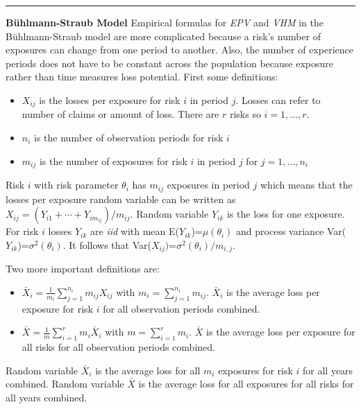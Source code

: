 \documentclass[]{book}
\providecommand{\tightlist}{%
  \setlength{\itemsep}{0pt}\setlength{\parskip}{0pt}}
\theoremstyle{definition}
\theoremstyle{definition}
\theoremstyle{definition}
\theoremstyle{remark}
\begin{document}
\begin{center}\rule{0.5\linewidth}{\linethickness}\end{center}

\textbf{Bühlmann-Straub Model} Empirical formulas for \emph{EPV} and
\emph{VHM} in the Bühlmann-Straub model are more complicated because a
risk's number of exposures can change from one period to another. Also,
the number of experience periods does not have to be constant across the
population because exposure rather than time measures loss potential.
First some definitions:

\begin{itemize}
\tightlist
\item
  \(X_{ij}\) is the losses per exposure for risk \(i\) in period \(j\).
  Losses can refer to number of claims or amount of loss. There are
  \(r\) risks so \(i=1,\ldots,r\).
\item
  \(n_i\) is the number of observation periods for risk \(i\)
\item
  \(m_{ij}\) is the number of exposures for risk \(i\) in period \(j\)
  for \(j=1,\ldots,n_i\)
\end{itemize}

Risk \(i\) with risk parameter \(\theta_i\) has \(m_{ij}\) exposures in
period \(j\) which means that the losses per exposure random variable
can be written as \(X_{ij}=(Y_{i1}+\cdots+Y_{im_{ij}})/m_{ij}\). Random
variable \(Y_{ik}\) is the loss for one exposure. For risk \(i\) losses
\(Y_{ik}\) are \emph{iid} with mean E(\(Y_{ik}\))=\(\mu(\theta_i)\) and
process variance Var(\(Y_{ik}\))=\(\sigma^2(\theta_i)\). It follows that
Var(\(X_{ij})\)=\(\sigma^2(\theta_i)/m_{i,j}\).

Two more important definitions are:

\begin{itemize}
\tightlist
\item
  \(\bar{X}_i=\frac{1}{m_i}\sum_{j=1}^{n_i} m_{ij}X_{ij}\) with
  \(m_i = \sum_{j=1}^{n_i} m_{ij}\). \(\bar{X}_i\) is the average loss
  per exposure for risk \(i\) for all observation periods combined.
\item
  \(\bar{X}=\frac{1}{m}\sum_{i=1}^{r} m_i \bar{X}_i\) with
  \(m=\sum_{i=1}^r m_i\). \(\bar{X}\) is the average loss per exposure
  for all risks for all observation periods combined.
\end{itemize}

Random variable \(\bar{X}_i\) is the average loss for all \(m_i\)
exposures for risk \(i\) for all years combined. Random variable
\(\bar{X}\) is the average loss for all exposures for all risks for all
years combined.
\end{document}
